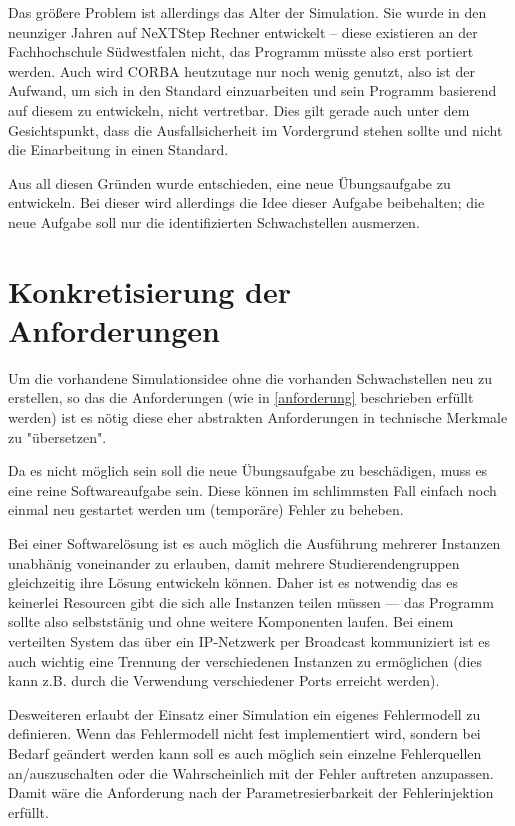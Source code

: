 Das gr{\"{o}}{\ss}ere Problem ist allerdings das Alter der Simulation. Sie wurde in den neunziger Jahren auf 
NeXTStep Rechner entwickelt -- diese existieren an der Fachhochschule S{\"{u}}dwestfalen nicht, das Programm 
m{\"{u}}sste also erst portiert werden. Auch wird CORBA heutzutage nur noch wenig genutzt, also ist der Aufwand,
um sich in den Standard einzuarbeiten und sein Programm basierend auf diesem zu entwickeln, nicht vertretbar. 
Dies gilt gerade auch unter dem Gesichtspunkt, dass die Ausfallsicherheit im Vordergrund stehen sollte und
nicht die Einarbeitung in einen Standard.

Aus all diesen Gr{\"{u}}nden wurde entschieden, eine neue {\"{U}}bungsaufgabe zu entwickeln. Bei dieser wird
allerdings die Idee dieser Aufgabe beibehalten; die neue Aufgabe soll nur die identifizierten Schwachstellen
ausmerzen.

\clearpage
\section{Konkretisierung der Anforderungen}
Um die vorhandene Simulationsidee ohne die vorhanden Schwachstellen neu zu erstellen, so das die Anforderungen
(wie in \ref{anforderung} beschrieben erf{\"{u}}llt werden) ist es n{\"{o}}tig diese eher abstrakten Anforderungen in
technische Merkmale zu "{\"{u}}bersetzen".

Da es nicht m{\"{o}}glich sein soll die neue {\"{U}}bungsaufgabe zu besch{\"{a}}digen, muss es eine reine Softwareaufgabe
sein. Diese k{\"{o}}nnen im schlimmsten Fall einfach noch einmal neu gestartet werden um (tempor{\"{a}}re) Fehler zu
beheben.

Bei einer Softwarel{\"{o}}sung ist es auch m{\"{o}}glich die Ausf{\"{u}}hrung mehrerer Instanzen unabh{\"{a}}nig voneinander
zu erlauben, damit mehrere Studierendengruppen gleichzeitig ihre L{\"{o}}sung entwickeln k{\"{o}}nnen. Daher ist es notwendig
das es keinerlei Resourcen gibt die sich alle Instanzen teilen m{\"{u}}ssen --- das Programm sollte also selbstst{\"{a}}nig und
ohne weitere Komponenten laufen. Bei einem verteilten System das {\"{u}}ber ein IP-Netzwerk per Broadcast kommuniziert ist es
auch wichtig eine Trennung der verschiedenen Instanzen zu erm{\"{o}}glichen (dies kann z.B. durch die Verwendung verschiedener
Ports erreicht werden).

Desweiteren erlaubt der Einsatz einer Simulation ein eigenes Fehlermodell zu definieren. Wenn das Fehlermodell nicht fest
implementiert wird, sondern bei Bedarf ge{\"{a}}ndert werden kann soll es auch m{\"{o}}glich sein einzelne Fehlerquellen an/auszuschalten
oder die Wahrscheinlich mit der Fehler auftreten anzupassen. Damit w{\"{a}}re die Anforderung nach der Parametresierbarkeit
der Fehlerinjektion erf{\"{u}}llt.

